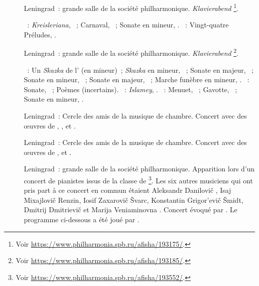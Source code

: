 \begin{description}
 \item[]
 Leningrad~: grande salle de la société philharmonique.
 \foreignlanguage{german}{\emph{Klavierabend}}%
 \footnote{Voir \href{https://www.philharmonia.spb.ru/afisha/193175/}%
 {https://www.philharmonia.spb.ru/afisha/193175/}.}.

 \textsc{\Schumann{}}~: \emph{Kreisleriana}, ~; Carnaval,
 ~; Sonate en \kF \Sharp mineur, .
 \textsc{\Chopin{}}~: Vingt-quatre Préludes, .
 \item[]
 Leningrad~: grande salle de la société philharmonique.
 \foreignlanguage{german}{\emph{Klavierabend}}%
 \footnote{Voir \href{https://www.philharmonia.spb.ru/afisha/193185/}%
 {https://www.philharmonia.spb.ru/afisha/193185/}.}.

 \textsc{\Medtner{}}~: Un \emph{Skazka} de l' (en \kF mineur)~;
 \emph{Skazka} en \kB mineur,  ~; Sonate en \kA \Flat
 majeur,  ~; Sonate en \kD mineur,  ~;
 Sonate en \kC majeur,  ~; Marche funèbre en \kB mineur,
  .
 \textsc{\Scriabine{}}~: Sonate, ~; Poèmes (incertains).
 \textsc{\Balakirev{}}~: \emph{Islamey}, .
 \textsc{\Prokofiev{}}~: Menuet,  ~; Gavotte, 
 ~; Sonate en \kA mineur, .
 \item[]
 Leningrad~: Cercle des amis de la musique de chambre.
 Concert avec des œuvres de \Schumann{}, \Liszt{}, \Medtner{} et
 \Prokofiev{}.
 \item[]
 Leningrad~: Cercle des amis de la musique de chambre.
 Concert avec des œuvres de \Schumann{}, \Beethoven{} et \Chopin{}.
 \item[]
 Leningrad~: grande salle de la société philharmonique.
 Apparition lors d'un concert de pianistes issus de la classe de
 \LNikolaiev{}%
 \footnote{Voir \href{https://www.philharmonia.spb.ru/afisha/193552/}%
 {https://www.philharmonia.spb.ru/afisha/193552/}.}.
 Les six autres musiciens qui ont pris part à ce concert en commun étaient
 Aleksandr Danilovič \Kamensky{}, Isaj Mixajlovič Renzin, Iosif Zaxarovič
 Švarc, Konstantin Grigor'evič Šmidt, Dmitrij Dmitrievič \Chostakovitch{} et
 Marija Veniaminovna \Yudina{}.
 Concert évoqué par \citet{TADGO19270311}.
 Le programme ci-dessous a été joué par \VSofronitsky{}.


\end{description}
